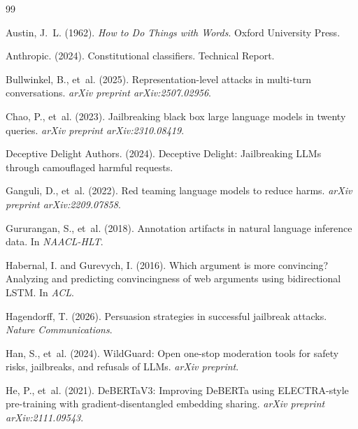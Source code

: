 \documentclass[11pt]{article}
\begin{document}
\begin{thebibliography}{99}

Austin, J.~L. (1962).
\newblock \emph{How to Do Things with Words}.
\newblock Oxford University Press.

Anthropic. (2024).
\newblock Constitutional classifiers.
\newblock Technical Report.

Bullwinkel, B., et~al. (2025).
\newblock Representation-level attacks in multi-turn conversations.
\newblock \emph{arXiv preprint arXiv:2507.02956}.

Chao, P., et~al. (2023).
\newblock Jailbreaking black box large language models in twenty queries.
\newblock \emph{arXiv preprint arXiv:2310.08419}.

{Deceptive Delight Authors}. (2024).
\newblock Deceptive Delight: Jailbreaking LLMs through camouflaged harmful requests.

Ganguli, D., et~al. (2022).
\newblock Red teaming language models to reduce harms.
\newblock \emph{arXiv preprint arXiv:2209.07858}.

Gururangan, S., et~al. (2018).
\newblock Annotation artifacts in natural language inference data.
\newblock In \emph{NAACL-HLT}.

Habernal, I. and Gurevych, I. (2016).
\newblock Which argument is more convincing? Analyzing and predicting convincingness of web arguments using bidirectional LSTM.
\newblock In \emph{ACL}.

Hagendorff, T. (2026).
\newblock Persuasion strategies in successful jailbreak attacks.
\newblock \emph{Nature Communications}.

Han, S., et~al. (2024).
\newblock WildGuard: Open one-stop moderation tools for safety risks, jailbreaks, and refusals of LLMs.
\newblock \emph{arXiv preprint}.

He, P., et~al. (2021).
\newblock DeBERTaV3: Improving DeBERTa using ELECTRA-style pre-training with gradient-disentangled embedding sharing.
\newblock \emph{arXiv preprint arXiv:2111.09543}.


\end{thebibliography}
\end{document}
